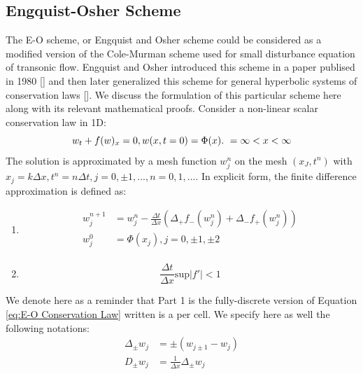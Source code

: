 \documentclass[a4paper]{article}
\numberwithin{equation}{section}
\begin{document}
\subsection{Engquist-Osher Scheme}
The E-O scheme, or Engquist and Osher scheme could be considered as a modified version of the Cole-Murman scheme used for small disturbance equation of transonic flow.  Engquist and Osher introduced this scheme in a paper publised in 1980 [] and then later generalized this scheme for general hyperbolic systems of conservation laws []. We discuss the formulation of this particular scheme here along with its relevant mathematical proofs.
Consider a non-linear scalar conservation law in 1D:
\begin{equation} 
    w_t + f(w)_x = 0,\\ w(x,t=0) = \Phi(x). \ =\infty < x< \infty
\end{equation}
The solution is approximated by a mesh function $w_j^n$ on the mesh ${(x_J,t^n)}$ with $x_j = k \Delta x, t^n = n \Delta t, j = 0, \pm 1,...,n=0,1,...$. In explicit form, the finite difference approximation is defined as:
\begin{enumerate}
    \item 
\begin{equation} \label{eq:E-O Conservation Law}
    \begin{split}
        w_j^{n+1} &= w_j^n - \frac{\Delta t}{\Delta x}\left(\Delta_{+} f_{-} (w_j^n) + \Delta_{-} f_{+} (w_j^n) \right) \\
        w_j^0 &= \Phi(x_j), j = 0, \pm 1, \pm 2\\
    \end{split}
\end{equation}
    \item \label{eq:E-O_CFL}
        \begin{equation}
            \frac{\Delta t}{\Delta x} \text{sup} |f'| < 1
        \end{equation}

\end{enumerate}
We denote here as a reminder that Part 1 is the fully-discrete version of Equation \ref{eq:E-O Conservation Law} written is a per cell. We specify here as well the following notations:
\begin{equation}
    \begin{split}
        \Delta_{\pm} w_j &= \pm (w_{j\pm 1} - w_j)\\
        D_{\pm} w_j &= \frac{1}{\Delta x} \Delta_{\pm} w_j\\
    \end{split} 
\end{equation}
\end{document}
